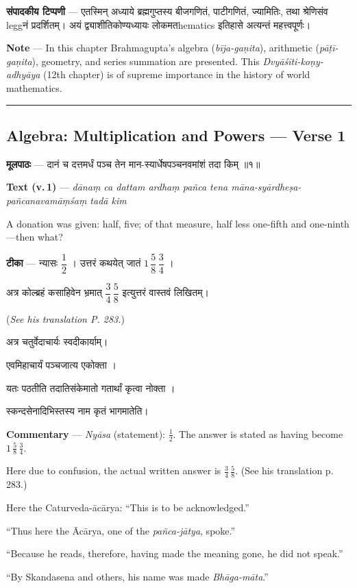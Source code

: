 \documentclass[11pt,a4paper]{article}
\newcommand{\skt}[1]{{\devanagarifont\color{sktcolor} #1}}
\newenvironment{bilingual}{%
  \par\noindent
  \begin{minipage}[t]{0.47\textwidth}%
}{%
  \par\end{minipage}%
}
\newcommand{\rightcol}{%
  \par\end{minipage}%
  \hfill
  \begin{minipage}[t]{0.47\textwidth}%
}
\begin{document}
\begin{bilingual}
\textbf{संपादकीय टिप्पणी} --- एतस्मिन् अध्याये ब्रह्मगुप्तस्य बीजगणितं, पाटीगणितं, ज्यामितिः, तथा श्रेणिसंव leggनं प्रदर्शितम्। अयं द्व्याशीतिकोण्यध्यायः लोकमतhematics इतिहासे अत्यन्तं महत्त्वपूर्णः।
\rightcol
\textbf{Note} --- In this chapter Brahmagupta's algebra (\textit{bīja-gaṇita}), arithmetic (\textit{pāṭī-gaṇita}), geometry, and series summation are presented. This \textit{Dvyāśīti-koṇy-adhyāya} (12th chapter) is of supreme importance in the history of world mathematics.
\end{bilingual}

\medskip
\noindent\rule{\textwidth}{0.4pt}

\subsection*{Algebra: Multiplication and Powers --- Verse 1}

\begin{bilingual}
\textbf{मूलपाठः} --- \skt{दानं च दत्तमर्धं पञ्च तेन मान-स्यार्धेषपञ्चनवमांशं तदा किम्} ॥१॥
\rightcol
\textbf{Text (v.\,1)} --- \textit{dānaṃ ca dattam ardhaṃ pañca tena māna-syārdheṣa-pañcanavamāṃśaṃ tadā kim}

A donation was given: half, five; of that measure, half less one-fifth and one-ninth---then what?
\end{bilingual}

\medskip

\begin{bilingual}
\textbf{टीका} --- \skt{न्यासः} $\dfrac{1}{2}$ । \skt{उत्तरं कथयेत् जातं} $1\,\dfrac{5}{8}\,\dfrac{3}{4}$ ।

\skt{अत्र कोल्ब्रहं कसाहिवेन भ्रमात्} $\dfrac{3}{4}\,\dfrac{5}{8}$ \skt{इत्युत्तरं वास्तवं लिखितम्}।

(\textit{See his translation P. 283.})

अत्र चतुर्वेदाचार्यः \skt{स्वदीकार्याम्}।

\skt{एवमिहाचार्यं पञ्चजात्य एकोक्ता} ।

\skt{यतः पठतीति तदातिसंकेमातो गतार्थां कृत्वा नोक्ता} ।

\skt{स्कन्दसेनादिभिस्तस्य नाम कृतं भागमातेति}।
\rightcol
\textbf{Commentary} --- \textit{Nyāsa} (statement): $\frac{1}{2}$. The answer is stated as having become $1\,\frac{5}{8}\,\frac{3}{4}$.

Here due to confusion, the actual written answer is $\frac{3}{4}\,\frac{5}{8}$. (See his translation p.\,283.)

Here the Caturveda-ācārya: ``This is to be acknowledged.''

``Thus here the Ācārya, one of the \textit{pañca-jātya}, spoke.''

``Because he reads, therefore, having made the meaning gone, he did not speak.''

``By Skandasena and others, his name was made \textit{Bhāga-māta}.''
\end{bilingual}
\end{document}
